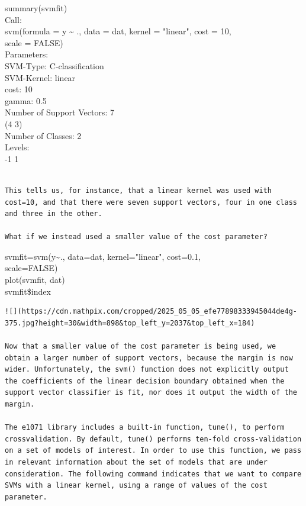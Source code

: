 \documentclass[10pt]{article}
\begin{document}
\begin{displayquote}
summary(svmfit)\\
Call:\\
svm(formula = y \~{} ., data = dat, kernel = "linear", cost = 10,\\
scale = FALSE)\\
Parameters:\\
SVM-Type: C-classification\\
SVM-Kernel: linear\\
cost: 10\\
gamma: 0.5\\
Number of Support Vectors: 7\\
(4 3)\\
Number of Classes: 2\\
Levels:\\
-1 1
\end{displayquote}

\begin{verbatim}

This tells us, for instance, that a linear kernel was used with cost=10, and that there were seven support vectors, four in one class and three in the other.

What if we instead used a smaller value of the cost parameter?
\end{verbatim}

\begin{displayquote}
svmfit=svm(y\~{}., data=dat, kernel="linear", cost=0.1,\\
scale=FALSE)\\
plot(svmfit, dat)\\
svmfit\$index
\end{displayquote}

\begin{verbatim}
![](https://cdn.mathpix.com/cropped/2025_05_05_efe77898333945044de4g-375.jpg?height=30&width=898&top_left_y=2037&top_left_x=184)

Now that a smaller value of the cost parameter is being used, we obtain a larger number of support vectors, because the margin is now wider. Unfortunately, the svm() function does not explicitly output the coefficients of the linear decision boundary obtained when the support vector classifier is fit, nor does it output the width of the margin.

The e1071 library includes a built-in function, tune(), to perform crossvalidation. By default, tune() performs ten-fold cross-validation on a set of models of interest. In order to use this function, we pass in relevant information about the set of models that are under consideration. The following command indicates that we want to compare SVMs with a linear kernel, using a range of values of the cost parameter.
\end{verbatim}
\end{document}
